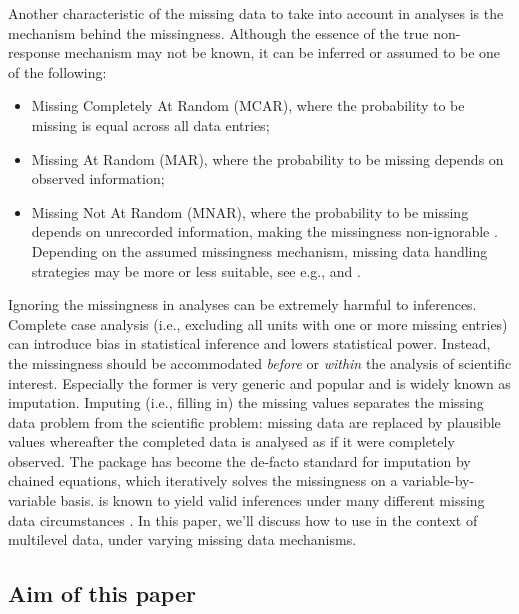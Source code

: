 \documentclass[
]{jss}
\providecommand{\tightlist}{%
  \setlength{\itemsep}{0pt}\setlength{\parskip}{0pt}}
\begin{document}
Another characteristic of the missing data to take into account in
analyses is the mechanism behind the missingness. Although the essence
of the true non-response mechanism may not be known, it can be inferred
or assumed to be one of the following:

\begin{itemize}
\tightlist
\item
  Missing Completely At Random (MCAR), where the probability to be
  missing is equal across all data entries;
\item
  Missing At Random (MAR), where the probability to be missing depends
  on observed information;
\item
  Missing Not At Random (MNAR), where the probability to be missing
  depends on unrecorded information, making the missingness
  non-ignorable \citep{rubi76, meng94}. Depending on the assumed
  missingness mechanism, missing data handling strategies may be more or
  less suitable, see e.g., \citet{yuce08} and \citet{hox15}.
\end{itemize}

Ignoring the missingness in analyses can be extremely harmful to
inferences. Complete case analysis (i.e., excluding all units with one
or more missing entries) can introduce bias in statistical inference and
lowers statistical power. Instead, the missingness should be
accommodated \emph{before} or \emph{within} the analysis of scientific
interest. Especially the former is very generic and popular and is
widely known as imputation. Imputing (i.e., filling in) the missing
values separates the missing data problem from the scientific problem:
missing data are replaced by plausible values whereafter the completed
data is analysed as if it were completely observed. The 
package  has become the de-facto standard for imputation by
chained equations, which iteratively solves the missingness on a
variable-by-variable basis.  is known to yield valid
inferences under many different missing data circumstances
\citep{buur18}. In this paper, we'll discuss how to use  in
the context of multilevel data, under varying missing data mechanisms.

\hypertarget{aim-of-this-paper}{%
\subsection{Aim of this paper}\label{aim-of-this-paper}}
\end{document}
